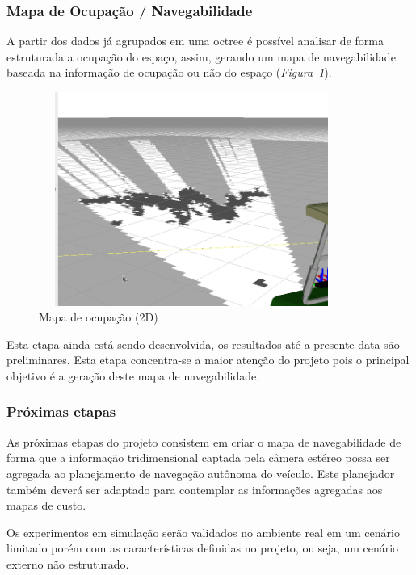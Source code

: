 \documentclass{article}
\newcommand{\fig}[1]{\textit{Figura~\ref{#1}}}
\begin{document}
\subsubsection{Mapa de Ocupação / Navegabilidade}

A partir dos dados já agrupados em uma octree é possível analisar de forma
estruturada a ocupação do espaço, assim, gerando um mapa de navegabilidade
baseada na informação de ocupação ou não do espaço (\fig{fig:map}).

\begin{figure}[!h]
  	\centering
    \includegraphics[width=10cm,height=7cm,]{../images/arq_mapa.png}
 	\caption{Mapa de ocupação (2D)}
 	\label{fig:map}
\end{figure}

Esta etapa ainda está sendo desenvolvida, os resultados até a presente data são
preliminares. Esta etapa concentra-se a maior atenção do projeto pois o
principal objetivo é a geração deste mapa de navegabilidade. 


\subsubsection{Próximas etapas}

As próximas etapas do projeto consistem em criar o mapa de navegabilidade de
forma que a informação tridimensional captada pela câmera estéreo possa ser
agregada ao planejamento de navegação autônoma do veículo. Este planejador
também deverá ser adaptado para contemplar as informações agregadas aos mapas de
custo.



Os experimentos em simulação serão validados no ambiente real em um cenário
limitado porém com as características definidas no projeto, ou seja, um cenário
externo não estruturado.
\end{document}
